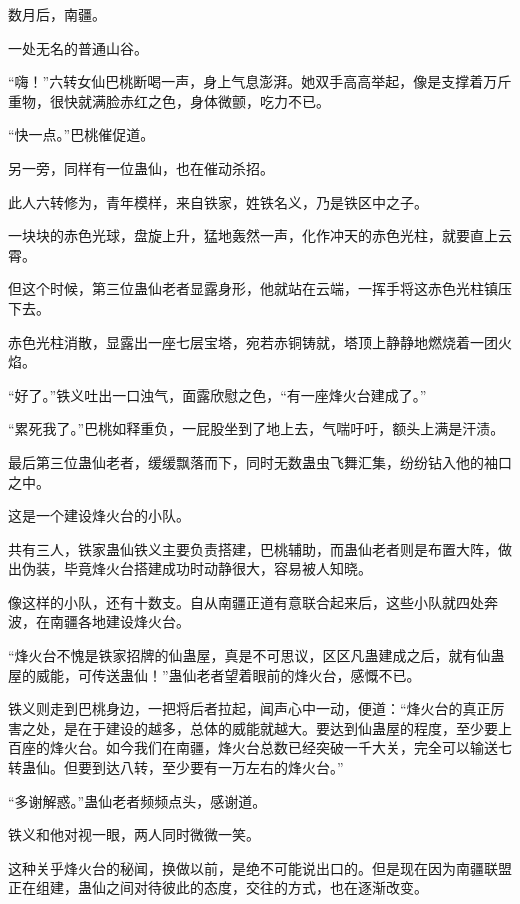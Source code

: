 
\begin{this_body}

数月后，南疆。

一处无名的普通山谷。

“嗨！”六转女仙巴桃断喝一声，身上气息澎湃。她双手高高举起，像是支撑着万斤重物，很快就满脸赤红之色，身体微颤，吃力不已。

“快一点。”巴桃催促道。

另一旁，同样有一位蛊仙，也在催动杀招。

此人六转修为，青年模样，来自铁家，姓铁名义，乃是铁区中之子。

一块块的赤色光球，盘旋上升，猛地轰然一声，化作冲天的赤色光柱，就要直上云霄。

但这个时候，第三位蛊仙老者显露身形，他就站在云端，一挥手将这赤色光柱镇压下去。

赤色光柱消散，显露出一座七层宝塔，宛若赤铜铸就，塔顶上静静地燃烧着一团火焰。

“好了。”铁义吐出一口浊气，面露欣慰之色，“有一座烽火台建成了。”

“累死我了。”巴桃如释重负，一屁股坐到了地上去，气喘吁吁，额头上满是汗渍。

最后第三位蛊仙老者，缓缓飘落而下，同时无数蛊虫飞舞汇集，纷纷钻入他的袖口之中。

这是一个建设烽火台的小队。

共有三人，铁家蛊仙铁义主要负责搭建，巴桃辅助，而蛊仙老者则是布置大阵，做出伪装，毕竟烽火台搭建成功时动静很大，容易被人知晓。

像这样的小队，还有十数支。自从南疆正道有意联合起来后，这些小队就四处奔波，在南疆各地建设烽火台。

“烽火台不愧是铁家招牌的仙蛊屋，真是不可思议，区区凡蛊建成之后，就有仙蛊屋的威能，可传送蛊仙！”蛊仙老者望着眼前的烽火台，感慨不已。

铁义则走到巴桃身边，一把将后者拉起，闻声心中一动，便道：“烽火台的真正厉害之处，是在于建设的越多，总体的威能就越大。要达到仙蛊屋的程度，至少要上百座的烽火台。如今我们在南疆，烽火台总数已经突破一千大关，完全可以输送七转蛊仙。但要到达八转，至少要有一万左右的烽火台。”

“多谢解惑。”蛊仙老者频频点头，感谢道。

铁义和他对视一眼，两人同时微微一笑。

这种关乎烽火台的秘闻，换做以前，是绝不可能说出口的。但是现在因为南疆联盟正在组建，蛊仙之间对待彼此的态度，交往的方式，也在逐渐改变。


\end{this_body}
